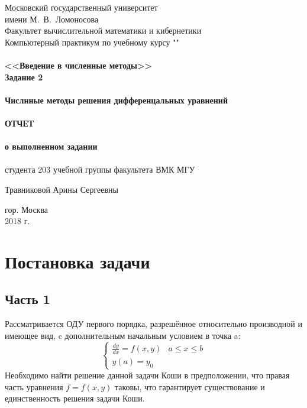 \documentclass[a4paper,12pt,titlepage,finall]{article}
\begin{document}
\begin{titlepage}
    \begin{center}
	{\small \sc Московский государственный университет \\имени М.~В.~Ломоносова\\
	Факультет вычислительной математики и кибернетики\\}
	\vfill
	{\Large \sc Компьютерный практикум по учебному курсу ""}\\
	~\\
	{\large \bf <<Введение в численные методы>> \\
	Задание 2}\\
	~\\
	{\small \bf  Числнные методы решения дифференцальных уравнений\\ }
	~\\ 
	{\large \bf  ОТЧЕТ \\ }
	~\\
	{\small \bf  о выполненном задании \\ }
	~\\
	{\small \sc студента 203 учебной группы факультета ВМК МГУ\\}

	{\small \sc Травниковой Арины Сергеевны\\}
	\vfill
    \end{center}

    \begin{center}
	\vfill
	{\small гор. Москва\\2018 г.}
    \end{center}
\end{titlepage}

\tableofcontents

\newpage

\section{Постановка задачи}

\subsection{Часть 1}
Рассматривается ОДУ первого порядка, разрешённое относительно производной и имеющее вид, c дополнительным начальным условием в точка a:
	\begin{equation*}
	\begin{cases}
	 \frac{dy}{dx} = f(x, y) &  a \leq x \leq b  \\
	 y(a) = y_{0} 
	\end{cases}
	\end{equation*}
Необходимо найти решение данной задачи Коши в предположении, что правая часть уравнения $f = f(x, y)$ таковы, что гарантирует существование и единственность решения задачи Коши.
\end{document}

